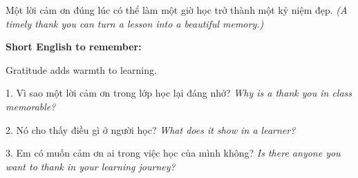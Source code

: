 \begin{baihoc}
Một lời cảm ơn đúng lúc có thể làm một giờ học trở thành một kỷ niệm đẹp.
\textit{(A timely thank you can turn a lesson into a beautiful memory.)}
\end{baihoc}

\begin{ghinhoanh}
\textbf{Short English to remember:}

Gratitude adds warmth to learning.

\end{ghinhoanh}

\begin{tuhocnhanh}
1. Vì sao một lời cảm ơn trong lớp học lại đáng nhớ? \textit{Why is a thank you in class memorable?}

2. Nó cho thấy điều gì ở người học? \textit{What does it show in a learner?}

3. Em có muốn cảm ơn ai trong việc học của mình không? \textit{Is there anyone you want to thank in your learning journey?}
\end{tuhocnhanh}
\ngancach